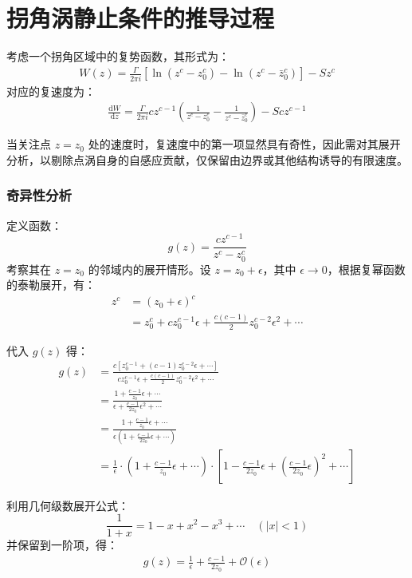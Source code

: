 
\section{拐角涡静止条件的推导过程}

考虑一个拐角区域中的复势函数，其形式为：
\begin{align}
    W(z)=\frac{\Gamma}{2\pi i}\left[\ln(z^{c}-z_{0}^{c})-\ln(z^{c}-\bar{z}_{0}^{c})\right]-Sz^{c}
\end{align}
对应的复速度为：
\begin{align}
    \frac{\mathrm{d}W}{\mathrm{d}z}=\frac{\Gamma}{2\pi i}cz^{c-1}\left(\frac{1}{z^{c}-z_{0}^{c}}-\frac{1}{z^{c}-\bar{z}_{0}^{c}}\right)-Scz^{c-1}
\end{align}

当关注点 $z = z_0$ 处的速度时，复速度中的第一项显然具有奇性，因此需对其展开分析，以剔除点涡自身的自感应贡献，仅保留由边界或其他结构诱导的有限速度。

\subsubsection{奇异性分析}

定义函数：
\[
g(z) = \frac{cz^{c-1}}{z^{c}-z_{0}^{c}}
\]
考察其在 $z = z_0$ 的邻域内的展开情形。设 $z = z_0 + \epsilon$，其中 $\epsilon \to 0$，根据复幂函数的泰勒展开，有：
\begin{align*}
    z^{c} &= (z_{0}+\epsilon)^{c} \\
    &= z_{0}^{c} + cz_{0}^{c-1}\epsilon + \frac{c(c-1)}{2}z_{0}^{c-2}\epsilon^{2} + \cdots
\end{align*}

代入 $g(z)$ 得：
\begin{align*}
    g(z) &= \frac{c\left[z_{0}^{c-1}+(c-1)z_{0}^{c-2}\epsilon+\cdots\right]}{cz_{0}^{c-1}\epsilon+\frac{c(c-1)}{2}z_{0}^{c-2}\epsilon^{2}+\cdots} \\
    &= \frac{1+\frac{c-1}{z_{0}}\epsilon+\cdots}{\epsilon+\frac{c-1}{2z_{0}}\epsilon^{2}+\cdots} \\
    &= \frac{1+\frac{c-1}{z_{0}}\epsilon+\cdots}{\epsilon\left(1+\frac{c-1}{2z_{0}}\epsilon+\cdots\right)} \\
    &= \frac{1}{\epsilon} \cdot \left(1 + \frac{c-1}{z_{0}}\epsilon + \cdots \right) \cdot \left[1 - \frac{c-1}{2z_{0}}\epsilon + \left(\frac{c-1}{2z_0}\epsilon\right)^2 + \cdots \right]
\end{align*}

利用几何级数展开公式：
\[
\frac{1}{1+x} = 1 - x + x^2 - x^3 + \cdots \quad (|x|<1)
\]
并保留到一阶项，得：
\begin{align}
    g(z) = \frac{1}{\epsilon} + \frac{c-1}{2z_{0}} + \mathcal{O}(\epsilon)
\end{align}

